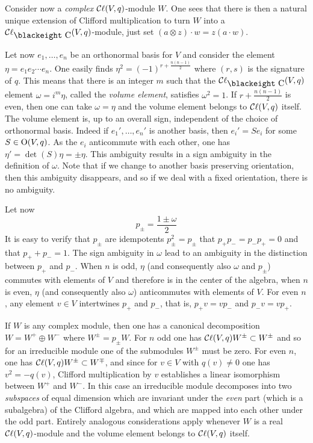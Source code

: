 \documentclass[12pt,titlepage]{article}
\def\bbfeight#1{\hbox{\blackeight #1}}
\def\lCe{\bbfeight C}
\def\cC{{\cal C}}
\def\Cl{{\cC\ell}}
\def\O{\hbox{O}}
\begin{document}
Consider now a {\em complex\/} \(\Cl(V,q)\)-module \(W\).  
One sees that there is then a natural unique 
extension of Clifford multiplication to turn \(W\) into a 
\(\Cl_{\lCe}(V,q)\)-module, just set \((a\otimes z)\cdot w=z(a\cdot w)\).

Let now \(e_1,\dots,e_n\) be an orthonormal basis for \(V\) and 
consider the 
element \(\eta=e_1e_2\cdots e_n\).  One easily finds \(\eta^2=(-
1)^{r+\frac{n(n-1)}{2}}\) where \((r,s)\) is the signature of \(q\). This 
means that there is an integer \(m\) such that the 
\(\Cl_{\lCe}(V,q)\) element  
\(\omega=i^m\eta\), called the {\em volume element\/}, 
%
satisfies 
\(\omega^2=1\). If \(r+\frac{n(n-1)}{2}\) is even, then  one can take
\(\omega=\eta\) and the volume element belongs to \(\Cl(V,q)\) itself.
The volume element is, up to an overall sign, 
independent of 
the choice of orthonormal basis. Indeed if \(e_1',\dots,e_n'\) is another 
basis, then \(e_i'=Se_i\) for some \(S\in \O(V,q)\). As the \(e_i\) 
anticommute with each other, one has \(\eta'=\det(S)\eta=\pm\eta\). This 
ambiguity results in a sign ambiguity in the definition of \(\omega\).
Note that if we change to another basis preserving orientation, then this 
ambiguity disappears, and so if we deal with a fixed orientation,
there is  no ambiguity.

 Let now  
\begin{equation}\label{eq:cliffids}
p_{\pm}=\frac{1\pm \omega}{2}
\end{equation}
It is easy to verify that 
\(p_{\pm}\) are idempotents \(p_{\pm}^2=p_{\pm}\) that \(p_+p_-=p_-p_+=0\) 
and that \(p_++p_-=1\). The sign ambiguity in \(\omega\) lead to an 
ambiguity 
in the distinction between \(p_+\) and \(p_-\).
When \(n\) is odd, \(\eta\) (and consequently also \(\omega\) and 
\(p_{\pm}\)) commutes with elements of \(V\) and therefore 
is in the center of 
the algebra, when \(n\) is even, \(\eta\) (and consequently 
also \(\omega\)) 
anticommutes with elements of \(V\). For even \(n\), any element \(v\in V\) 
intertwines \(p_+\) and \(p_-\), that is, \(p_+v=vp_-\) and \(p_-v=vp_+\). 

If \(W\) is any complex module, then one has a canonical 
decomposition \(W=W^+\oplus W^-\) where \(W^{\pm}=p_{\pm} W\). 
For \(n\) odd 
one has \(\Cl(V,q)W^{\pm}\subset W^{\pm}\) and so for an irreducible module 
one of the submodules \(W^{\pm}\) must be zero. For even \(n\), one has 
\(\Cl(V,q)W^{\pm}\subset W^{\mp}\), and since for \(v\in V\) 
with \(q(v)\neq 
0\) one has \(v^2=-q(v)\), Clifford multiplication by  \(v\) establishes a 
linear isomorphism between \(W^+\) and \(W^-\). In this case an irreducible 
module decomposes into two {\em subspaces\/} of equal dimension which are 
invariant under the {\em even\/} part (which is a subalgebra) of 
the Clifford 
algebra, and which are mapped into each other under the odd part. 
Entirely analogous considerations apply whenever \(W\) is a real
\(\Cl(V,q)\)-module and the volume element belongs to \(\Cl(V,q)\)
itself.
\end{document}
